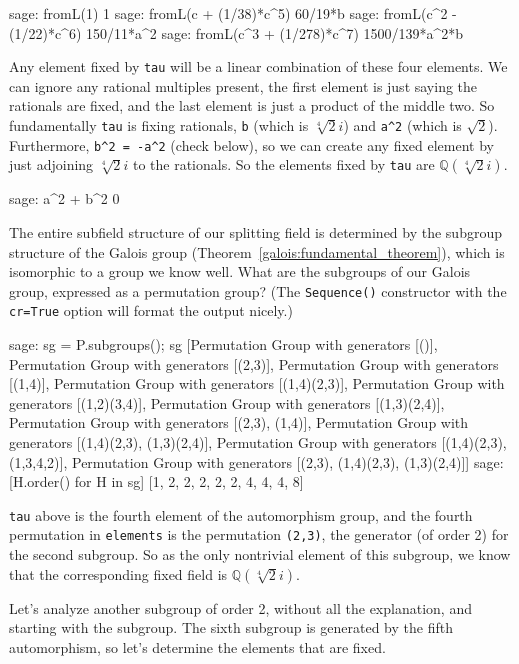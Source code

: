 %
\begin{sageexample}
sage: fromL(1)
1
sage: fromL(c + (1/38)*c^5)
60/19*b
sage: fromL(c^2 - (1/22)*c^6)
150/11*a^2
sage: fromL(c^3 + (1/278)*c^7)
1500/139*a^2*b
\end{sageexample}
%
Any element fixed by \verb?tau? will be a linear combination of these four elements.  We can ignore any rational multiples present, the first element is just saying the rationals are fixed, and the last element is just a product of the middle two.  So fundamentally \verb?tau? is fixing rationals, \verb?b? (which is $\sqrt[4]{2}i$) and \verb?a^2? (which is $\sqrt{2}$).  Furthermore, \verb?b^2 = -a^2? (check below), so we can create any fixed element by just adjoining $\sqrt[4]{2}i$ to the rationals.  So the elements fixed by \verb?tau? are ${\mathbb Q}(\sqrt[4]{2}i)$.
%
\begin{sageexample}
sage: a^2 + b^2
0
\end{sageexample}
%
%
%
The entire subfield structure of our splitting field is determined by the subgroup structure of the Galois group (Theorem~\ref{galois:fundamental_theorem}), which is isomorphic to a group we know well.  What are the subgroups of our Galois group, expressed as a permutation group? (The \verb?Sequence()? constructor with the \verb?cr=True? option will format the output nicely.)
%
\begin{sageexample}
sage: sg = P.subgroups(); sg
[Permutation Group with generators [()],
 Permutation Group with generators [(2,3)],
 Permutation Group with generators [(1,4)],
 Permutation Group with generators [(1,4)(2,3)],
 Permutation Group with generators [(1,2)(3,4)],
 Permutation Group with generators [(1,3)(2,4)],
 Permutation Group with generators [(2,3), (1,4)],
 Permutation Group with generators [(1,4)(2,3), (1,3)(2,4)],
 Permutation Group with generators [(1,4)(2,3), (1,3,4,2)],
 Permutation Group with generators [(2,3), (1,4)(2,3), (1,3)(2,4)]]
sage: [H.order() for H in sg]
[1, 2, 2, 2, 2, 2, 4, 4, 4, 8]
\end{sageexample}
%
\verb?tau? above is the fourth element of the automorphism group, and the fourth permutation in \verb?elements? is the permutation \verb?(2,3)?, the generator (of order 2) for the second subgroup.  So as the only nontrivial element of this subgroup, we know that the corresponding fixed field is ${\mathbb Q}(\sqrt[4]{2}i)$.\par
%
Let's analyze another subgroup of order 2, without all the explanation, and starting with the subgroup.  The sixth subgroup is generated by the fifth automorphism, so let's determine the elements that are fixed.
